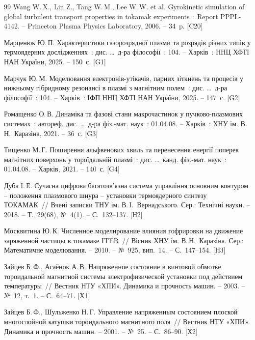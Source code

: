 \begin{thebibliography}{99}
 Wang W.\,X., Lin Z., Tang W.\,M., Lee W.\,W. et al. Gyrokinetic
  simulation of global turbulent transport properties in tokamak experiments~: Report
  PPPL-4142. -- Princeton Plasma Physics Laboratory, 2006. -- 34~p. [C20]

 Марценюк Ю.\,П. Характеристики газорозрядної плазми та
  розрядів різних типів у термоядерних дослідженнях~: дис. \ldots\ д-ра філософії~:
  104. -- Харків~: ННЦ ХФТІ НАН України, 2025. -- 150~с. [G1]

 Марчук Ю.\,М. Моделювання електронів-утікачів, парних зіткнень
  та процесів у нижньому гібридному резонансі в плазмі з магнітним полем~: дис.
  \ldots\ д-ра філософії~: 104. -- Харків~: ІФП ННЦ ХФТІ НАН України, 2025. --
  147~с. [G2]

 Ромащенко О.\,В. Динаміка та фазові стани макрочастинок у
  пучково-плазмових системах~: автореф. дис. \ldots\ д-ра фіз.-мат. наук~: 01.04.08.
  -- Харків~: ХНУ ім. В.\,Н.~Каразіна, 2021. -- 36~с. [G3]

 Тищенко М.\,Г. Поширення альфвенових хвиль та перенесення
  енергії поперек магнітних поверхонь у тороїдальній плазмі~: дис. \ldots\ канд.
  фіз.-мат. наук~: 01.04.08. -- Харків, 2021. -- 140~с. [G4]

 Дуба І.\,Е. Сучасна цифрова багатозв'язна система управління
  основним контуром -- положення плазмового шнура -- установки термоядерного синтезу
  ТОКАМАК~// Вчені записки ТНУ ім. В.\,І.~Вернадського. Сер.: Технічні науки. --
  2018. -- Т.~29(68), №~4(1). -- С.~132--137. [Н2]

 Москвитина Ю.\,К. Численное моделирование влияния
  гофрировки на движение заряженной частицы в токамаке ITER~// Вісник ХНУ ім.
  В.\,Н.~Каразіна. Сер.: Математичне моделювання. -- 2010. -- №~925, вип.~14. --
  С.~147--154. [Н3]

 Зайцев Б.\,Ф., Асаёнок А.\,В. Напряженное состояние в винтовой
  обмотке тороидальной магнитной системы электрофизической установки под действием
  температуры~// Вестник НТУ «ХПИ». Динамика и прочность машин. -- 2003. -- №~12,
  т.~1. -- С.~64--71. [Х1]

 Зайцев Б.\,Ф., Шульженко Н.\,Г. Управление напряженным
  состоянием плоской многослойной катушки тороидального магнитного поля~// Вестник
  НТУ «ХПИ». Динамика и прочность машин. -- 2001. -- №~25. -- С.~86--90. [Х2]


\end{thebibliography}
